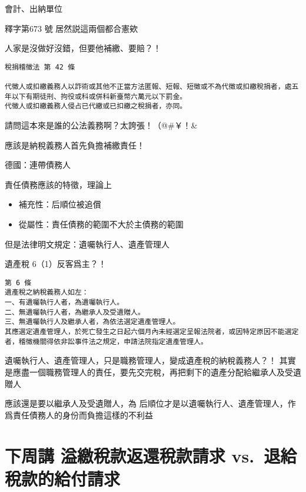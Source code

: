 \documentclass[]{ctexbook}
\providecommand{\tightlist}{%
  \setlength{\itemsep}{0pt}\setlength{\parskip}{0pt}}
\begin{document}
會計、出納單位

釋字第673 號 居然説這兩個都合憲欸

人家是沒做好沒錯，但要他補繳、要賠？！

\begin{verbatim}
稅捐稽徵法 第 42 條

代徵人或扣繳義務人以詐術或其他不正當方法匿報、短報、短徵或不為代徵或扣繳稅捐者，處五年以下有期徒刑、拘役或科或併科新臺幣六萬元以下罰金。
代徵人或扣繳義務人侵占已代繳或已扣繳之稅捐者，亦同。
\end{verbatim}

請問這本來是誰的公法義務啊？太誇張！（@\#￥！\&

應該是納稅義務人首先負擔補繳責任！

德國：連帶債務人

責任債務應該的特徵，理論上

\begin{itemize}
\tightlist
\item
  補充性：后順位被追償
\item
  從屬性：責任債務的範圍不大於主債務的範圍
\end{itemize}

但是法律明文規定：遺囑執行人、遺產管理人

遺產稅 6（1）反客爲主？！

\begin{verbatim}
第 6 條
遺產稅之納稅義務人如左：
一、有遺囑執行人者，為遺囑執行人。
二、無遺囑執行人者，為繼承人及受遺贈人。
三、無遺囑執行人及繼承人者，為依法選定遺產管理人。
其應選定遺產管理人，於死亡發生之日起六個月內未經選定呈報法院者，或因特定原因不能選定者，稽徵機關得依非訟事件法之規定，申請法院指定遺產管理人。
\end{verbatim}

遺囑執行人、遺產管理人，只是職務管理人，變成遺產稅的納稅義務人？！
其實是應盡一個職務管理人的責任，要先交完稅，再把剩下的遺產分配給繼承人及受遺贈人

應該還是要以繼承人及受遺贈人，為
后順位才是以遺囑執行人、遺產管理人，作爲責任債務人的身份而負擔這樣的不利益

\hypertarget{ux4e0bux5468ux8b1b-ux6ea2ux7e73ux7a05ux6b3eux8fd4ux9084ux7a05ux6b3eux8acbux6c42-vs.-ux9000ux7d66ux7a05ux6b3eux7684ux7d66ux4ed8ux8acbux6c42}{%
\section{下周講 溢繳稅款返還稅款請求 vs.~退給稅款的給付請求}\label{ux4e0bux5468ux8b1b-ux6ea2ux7e73ux7a05ux6b3eux8fd4ux9084ux7a05ux6b3eux8acbux6c42-vs.-ux9000ux7d66ux7a05ux6b3eux7684ux7d66ux4ed8ux8acbux6c42}}
\end{document}
